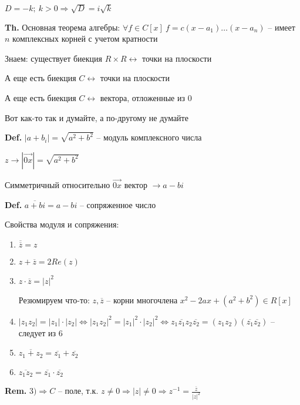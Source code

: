 \documentclass[14pt, letter paper]{article}
\begin{document}
$D = -k;\ k > 0 \Rightarrow \sqrt{D} = i\sqrt{k}$

\vspace{5mm}

\textbf{Th.} Основная теорема алгебры: $\forall f \in C[x]\ f = c(x - a_1) \ldots (x - a_n)$ -- имеет $n$ комплексных корней с учетом кратности

\vspace{3mm}

Знаем: существует биекция $R \times R \leftrightarrow$ точки на плоскости

А еще есть биекция $C \leftrightarrow$ точки на плоскости

А еще есть биекция $C \leftrightarrow$ вектора, отложенные из 0

Вот как-то так и думайте, а по-другому не думайте

\vspace{5mm}

\textbf{Def.} $|a + b_i| = \sqrt{a^2 + b^2}$ -- модуль комплексного числа

$z \rightarrow |\overrightarrow{0x}| = \sqrt{a^2 + b^2}$

Симметричный относительно $\overrightarrow{0x}$ вектор $\rightarrow a - bi$

\textbf{Def.} $\overline{a + bi} = a - bi$ -- сопряженное число

\vspace{5mm}

Свойства модуля и сопряжения:

\begin{enumerate}
    \item $\overline{\overline{z}} = z$
    \item $z + \overline{z} = 2Re(z)$
    \item $z \cdot \overline{z} = |z|^2$
    
    Резюмируем что-то: $z, \overline{z}$ -- корни многочлена $x^2 - 2ax + (a^2 + b^2) \in R[x]$
    \item $|z_1z_2| = |z_1| \cdot |z_2| \Leftrightarrow |z_1z_2|^2 = |z_1|^2 \cdot |z_2|^2 \Leftrightarrow z_1\overline{z_1}z_2\overline{z_2} = (z_1z_2)(\overline{z_1}\overline{z_2})$ -- следует из 6
    \item $\overline{z_1 + z_2} = \overline{z_1} + \overline{z_2}$
    \item $\overline{z_1z_2} = \overline{z_1} \cdot \overline{z_2}$
\end{enumerate}

\textbf{Rem.} $3) \Rightarrow C$ -- поле, т.к. $z \neq 0 \Rightarrow |z| \neq 0 \Rightarrow z^{-1} = \frac{\overline{z}}{|z|^2}$
\end{document}
